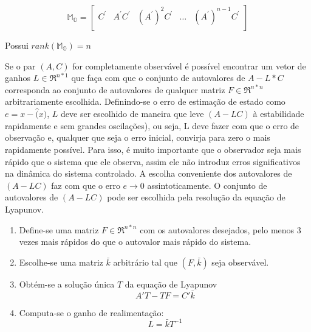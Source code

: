 \begin{equation}\label{eq:Matrix:MO}
    \mathbb{M_O}=
    \begin{bmatrix}
        C^'&A^'C^'&(A^')^2C^'&\dots&(A^')^{n-1}C^'\\
    \end{bmatrix}        
\end{equation}

Possui $rank(\mathbb{M_O}) = n$
 
Se o par $(A,C)$ for completamente observável é possível encontrar um vetor de ganhos $L\in \Re^{n*1}$ que faça com que o conjunto de autovalores de $A-L*C$ corresponda ao conjunto de autovalores de qualquer matriz $F \in \Re^{n*n}$ arbitrariamente escolhida. 
Definindo-se o erro de estimação de estado como $e=x-\hat(x)$, $L$ deve ser escolhido de maneira que leve $(A-LC)$ à estabilidade rapidamente e sem grandes oscilações), ou seja, L deve fazer com que o erro de observação e,
qualquer que seja o erro inicial, convirja para zero o mais rapidamente possível. Para isso, é muito importante que o observador seja mais rápido 
que o sistema que ele observa, assim ele não introduz erros significativos na dinâmica do sistema controlado. A escolha conveniente dos autovalores de $(A-LC)$ faz com que o erro $e\rightarrow0$ assintoticamente. 
O conjunto de autovalores de $(A-LC)$ pode ser escolhida pela resolução da equação de Lyapunov.
    
\begin{enumerate}
    \item Define-se uma matriz $F \in \Re^{n*n}$ com os autovalores desejados, pelo menos 3 vezes mais rápidos do que o autovalor mais rápido do sistema.
    \item Escolhe-se uma matriz $\bar{k}$ arbitrário tal que $(F,\bar{k})$ seja observável.
    \item {Obtém-se a solução única $T$ da equação de Lyapunov
    \begin{equation} \label{eq:lyapunov}
            A'T-TF=C'\bar{k}
    \end{equation}}
    \item {Computa-se o ganho de realimentação:
    \begin{equation} \label{eq:ganho}
            L=\bar{k}T^{-1}
    \end{equation}}
\end{enumerate}    